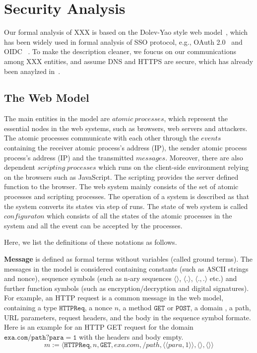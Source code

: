 \section{Security Analysis}
\label{sec:analysis}
Our formal analysis of XXX is based on the Dolev-Yao style web model~\cite{SPRESSO}, which has been widely used in formal analysis of SSO protocol, e.g., OAuth 2.0~\cite{FettKS16} and OIDC ~\cite{FettKS17}.
To make the description cleaner, we foucus on our communications among XXX entities, and assume DNS and HTTPS are secure, which has already been anaylzed in~\cite{SPRESSO}.


\subsection{The Web Model}

The main entities in the model are $atomic\ processes$, which represent the essential nodes in the web systems, such as browsers, web servers and attackers. The atomic processes communicate with each other through the $events$ containing the receiver atomic process's address (IP), the sender atomic process process's address (IP) and the transmitted $messages$. Moreover, there are also dependent $scripting\ processes$ which runs on the client-side environment relying on the browsers such as JavaScript. The scripting provides the server defined function to the browser.  The web system mainly consists of the set of atomic processes and scripting processes. The operation of a system is described as that the system converts its states via step of runs. The state of web system is called $configuraton$ which consists of all the states of the atomic processes in the system and all the event can be accepted by the processes.

Here, we list the definitions of these notations as follows. 


\vspace{1mm}\noindent\textbf{Message } is defined as formal terms without variables (called ground terms). The messages in the model is considered containing constants (such as ASCII strings and nonce), sequence symbols (such as n-ary sequences $\langle \rangle$, $\langle . \rangle$, $\langle . ,. \rangle$ etc.) and further function symbols (such as encryption/decryption and digital signatures). For example, an HTTP request is a common message in the web model, containing a type $\mathtt{HTTPReq}$, a nonce $n$, a method  $\mathtt{GET}$ or $\mathtt{POST}$,  a domain , a path, URL parameters, request headers, and the body  in the sequence symbol formate. Here is an example for an HTTP GET request for the domain  $\mathtt{exa.com/path?para=1}$ with the headers and body empty.
\begin{equation*}
    m:=\langle\mathtt{HTTPReq},n,\mathtt{GET},exa.com,/path,\langle \langle para, 1\rangle \rangle ,\langle \rangle,\langle \rangle \rangle
\end{equation*}

